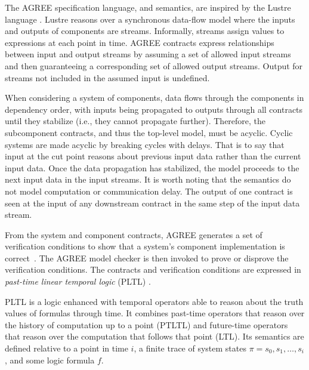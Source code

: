 
\newcommand{\globally}{\konst{Always}}
\newcommand{\historically}{\konst{Hist}}
\newcommand{\assumes}{\ensuremath{A}}
\newcommand{\guarantees}{\ensuremath{P}}
\newcommand{\inputs}{\ensuremath{I}}
\newcommand{\outputs}{\ensuremath{O}}
\newcommand{\components}{\ensuremath{C}}
\newcommand{\component}{\ensuremath{c}}

The AGREE specification language, and semantics, are inspired by the Lustre language \cite{10.1145/41625.41641}.
Lustre reasons over a synchronous data-flow model where the inputs and outputs of
components are streams.
Informally, streams assign values to expressions at each point in time.
AGREE contracts express relationships between input and output streams by assuming a set of allowed input streams and then guaranteeing a corresponding set of allowed output streams.
Output for streams not included in the assumed input is undefined. 

When considering a system of components,
data flows through the components in dependency order, with inputs
being propagated to outputs through all contracts until they stabilize
(i.e., they cannot propagate further). Therefore, the subcomponent contracts, and
thus the top-level model, must be acyclic. 
Cyclic systems are made acyclic by breaking cycles with delays.
That is to say that input at the cut point reasons about previous input data rather than the current input data.
Once the data propagation
has stabilized, the model proceeds to the next input data in the input
streams. It is worth noting that the semantics do not model computation or communication
delay. The output of one contract is seen at the input of any
downstream contract in the same step of the input data stream.

From the system and component contracts, AGREE generates a set of
verification conditions to show that a system's component
implementation is correct~\cite{agree2013}.  The AGREE model checker
is then invoked to prove or disprove the verification
conditions. The contracts and verification conditions are expressed in
\emph{past-time linear temporal logic} (PLTL) \cite{10.1093/jigpal/8.1.55}.

PLTL is a logic enhanced with temporal operators able to
reason about the truth values of formulas through time.
It combines past-time operators that reason over the history of computation up to a point (PTLTL) and future-time operators that reason over the computation that follows that point (LTL).
Its semantics
are defined relative to a point in time $i$, a finite trace of
system states $\pi = s_0, s_1, \ldots, s_i$, and some logic formula $f$.

